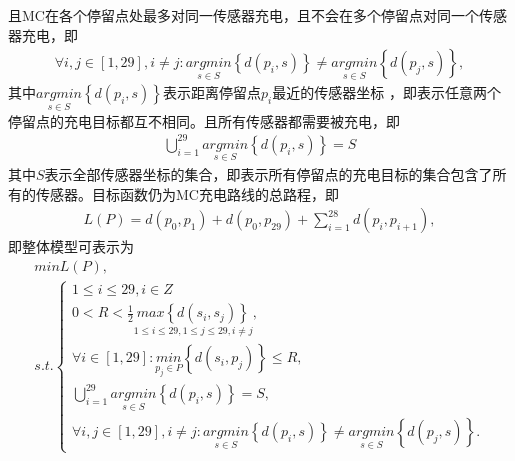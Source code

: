 \documentclass{whutmod}
\begin{document}
\begin{table}[H]
\begin{tablenotes}
	且MC在各个停留点处最多对同一传感器充电，且不会在多个停留点对同一个传感器充电，即
		\begin{gather}
		\forall i,j\in[1,29], i\neq j:  \underset{s\in S}{argmin}\left \{ d(p_i,s) \right \} \neq \underset{s\in S}{argmin}\left \{ d(p_j,s) \right \},
		\end{gather}
		其中$\underset{s\in S}{argmin}\left \{ d(p_i,s) \right \}$表示距离停留点$p_i$最近的传感器坐标 ，即表示任意两个停留点的充电目标都互不相同。且所有传感器都需要被充电，即
		\begin{gather}
		\bigcup_{i=1}^{29} \underset{s\in S}{argmin}\left \{ d(p_i,s) \right \}=S
		\end{gather}
			其中$S$表示全部传感器坐标的集合，即表示所有停留点的充电目标的集合包含了所有的传感器。目标函数仍为MC充电路线的总路程，即
		\begin{gather*}
		L(P)=d(p_0,p_{1})+d(p_0,p_{29})+\sum_{i=1}^{28}d(p_i,p_{i+1}) ,
		\end{gather*}
		即整体模型可表示为
		\begin{gather}
		min L(P) ,\\
	s.t.	\left\{\begin{matrix}1\leqslant i \leqslant 29 ,i\in Z
	\\0<R<\frac{1}{2}\underset{1\leqslant i\leqslant 29,1\leqslant j\leqslant 29,i\neq j}{max\left \{ d(s_i,s_j) \right \}},
		\\ 	\forall i\in[1,29]:   \underset{p_j\in P}{min}\left \{ d(s_i,p_j) \right \}\leqslant R,
		\\\bigcup_{i=1}^{29} \underset{s\in S}{argmin}\left \{ d(p_i,s) \right \}=S,
		\\\forall i,j\in[1,29], i\neq j:  \underset{s\in S}{argmin}\left \{ d(p_i,s) \right \} \neq \underset{s\in S}{argmin}\left \{ d(p_j,s) \right \}.
		\end{matrix}\right.
		\end{gather}
		

\end{tablenotes}
\end{table}
\end{document}
